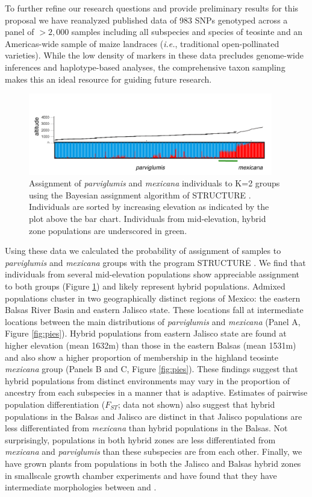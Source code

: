 To further refine our research questions and provide preliminary results for this proposal we have reanalyzed published data \citep{Fang2012} of 983 SNPs genotyped across a panel of $>2,000$ samples including all subspecies and species of teosinte and an Americas-wide sample of maize landraces (\emph{i.e.}, traditional open-pollinated varieties).
While the low density of markers in these data precludes genome-wide inferences and haplotype-based analyses, the comprehensive taxon sampling makes this an ideal resource for guiding future research.
\begin{figure}[t] 
  \centering
   \includegraphics[width=0.95\textwidth]{structure.pdf}
    \caption{Assignment of \emph{parviglumis} and \emph{mexicana} individuals to K=2 groups using the Bayesian assignment algorithm of STRUCTURE \citep{Pritchard2000}.  Individuals are sorted by increasing elevation as indicated by the plot above the bar chart. Individuals from mid-elevation, hybrid zone populations are underscored in green.} 
\label{fig:structure}
\end{figure}
Using these data we calculated the probability of assignment of samples to \emph{parviglumis} and \emph{mexicana} groups with the program STRUCTURE \citep{Pritchard2000}.  We find that individuals from several mid-elevation populations show appreciable assignment to both groups (Figure \ref{fig:structure}) and likely represent hybrid populations.  
Admixed populations cluster in two geographically distinct regions of Mexico: the eastern Balsas River Basin and eastern Jalisco state.
These locations fall at intermediate locations between the main distributions of \emph{parviglumis} and \emph{mexicana} (Panel A, Figure \ref{fig:pies}).
Hybrid populations from eastern Jalisco state are found at higher elevation (mean 1632m) than those in the eastern Balsas (mean 1531m) and also show a higher proportion of membership in the highland teosinte \emph{mexicana} group (Panels B and C, Figure \ref{fig:pies}).
These findings suggest that hybrid populations from distinct environments may vary in the proportion of ancestry from each subspecies in a manner that is adaptive.
Estimates of pairwise population differentiation ($F_{ST}$; data not shown) also suggest that hybrid populations in the Balsas and Jalisco are distinct in that Jalisco populations are less differentiated from \emph{mexicana} than hybrid populations in the Balsas.  Not surprisingly, populations in both hybrid zones are less differentiated from \emph{mexicana} and \emph{parviglumis} than these subspecies are from each other.
Finally, we have grown plants from populations in both the Jalisco and Balsas hybrid zones in smallscale growth chamber experiments and have found that they have intermediate morphologies between \zp{} and \zm{}.

